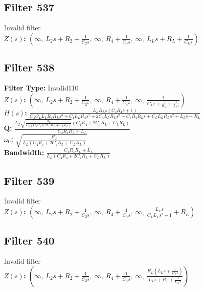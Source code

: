 \documentclass{article}
\begin{document}
\subsection*{Filter 537}
Invalid filter \\ 
\textbf{$Z(s)$:} $\left( \infty, \  L_{2} s + R_{2} + \frac{1}{C_{2} s}, \  \infty, \  R_{4} + \frac{1}{C_{4} s}, \  \infty, \  L_{L} s + R_{L} + \frac{1}{C_{L} s}\right)$ \\ 
\subsection*{Filter 538}
\textbf{Filter Type:} Invalid110 \\ 
\textbf{$Z(s)$:} $\left( \infty, \  L_{2} s + R_{2} + \frac{1}{C_{2} s}, \  \infty, \  R_{4} + \frac{1}{C_{4} s}, \  \infty, \  \frac{1}{C_{L} s + \frac{1}{R_{L}} + \frac{1}{L_{L} s}}\right)$ \\ 
\textbf{$H(s)$:} $\frac{L_{L} R_{L} s \left(C_{4} R_{4} s + 1\right)}{C_{4} C_{L} L_{L} R_{4} R_{L} s^{3} + C_{4} L_{L} R_{4} s^{2} + 2 C_{4} L_{L} R_{L} s^{2} + C_{4} R_{4} R_{L} s + C_{L} L_{L} R_{L} s^{2} + L_{L} s + R_{L}}$ \\ 
\textbf{Q:} $\frac{L_{L} \sqrt{\frac{R_{L}}{L_{L} \left(C_{4} R_{4} + 2 C_{4} R_{L} + C_{L} R_{L}\right)}} \left(C_{4} R_{4} + 2 C_{4} R_{L} + C_{L} R_{L}\right)}{C_{4} R_{4} R_{L} + L_{L}}$ \\ 
\textbf{$\omega_0$:} $\sqrt{\frac{R_{L}}{L_{L} \left(C_{4} R_{4} + 2 C_{4} R_{L} + C_{L} R_{L}\right)}}$ \\ 
\textbf{Bandwidth:} $\frac{C_{4} R_{4} R_{L} + L_{L}}{L_{L} \left(C_{4} R_{4} + 2 C_{4} R_{L} + C_{L} R_{L}\right)}$ \\ 
\subsection*{Filter 539}
Invalid filter \\ 
\textbf{$Z(s)$:} $\left( \infty, \  L_{2} s + R_{2} + \frac{1}{C_{2} s}, \  \infty, \  R_{4} + \frac{1}{C_{4} s}, \  \infty, \  \frac{L_{L} s}{C_{L} L_{L} s^{2} + 1} + R_{L}\right)$ \\ 
\subsection*{Filter 540}
Invalid filter \\ 
\textbf{$Z(s)$:} $\left( \infty, \  L_{2} s + R_{2} + \frac{1}{C_{2} s}, \  \infty, \  R_{4} + \frac{1}{C_{4} s}, \  \infty, \  \frac{R_{L} \left(L_{L} s + \frac{1}{C_{L} s}\right)}{L_{L} s + R_{L} + \frac{1}{C_{L} s}}\right)$ \\ 
\end{document}
